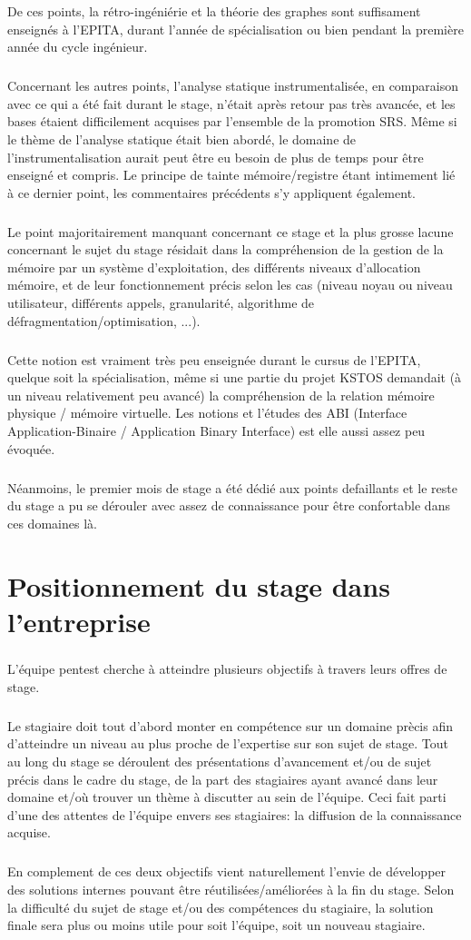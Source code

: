 De ces points, la rétro-ingéniérie et la théorie des graphes sont suffisament enseignés à l'EPITA,
durant l'année de spécialisation ou bien pendant la première année du cycle ingénieur.
\subparagraph{}
Concernant les autres points, l'analyse statique instrumentalisée, en comparaison avec ce qui a été
fait durant le stage, n'était après retour pas très avancée, et les bases étaient difficilement acquises par
l'ensemble de la promotion SRS. Même si le thème de l'analyse statique était bien abordé, le domaine de l'instrumentalisation
aurait peut être eu besoin de plus de temps pour être enseigné et compris. Le principe de tainte mémoire/registre étant intimement
lié à ce dernier point, les commentaires précédents s'y appliquent également.
\subparagraph{}
Le point majoritairement manquant concernant ce stage et la plus grosse lacune concernant le sujet du stage résidait dans la compréhension de
la gestion de la mémoire par un système d'exploitation, des différents niveaux d'allocation mémoire, et de leur fonctionnement précis
selon les cas (niveau noyau ou niveau utilisateur, différents appels, granularité, algorithme de défragmentation/optimisation, ...).
\subparagraph{}
Cette notion est vraiment très peu enseignée durant le cursus de l'EPITA, quelque soit la spécialisation, même si une partie du projet KSTOS
demandait (à un niveau relativement peu avancé) la compréhension de la relation mémoire physique / mémoire virtuelle.
Les notions et l'études des ABI (Interface Application-Binaire / Application Binary Interface) est elle aussi assez peu évoquée.
\subparagraph{}

Néanmoins, le premier mois de stage a été dédié aux points defaillants et le reste du stage a pu se dérouler avec assez de connaissance
pour être confortable dans ces domaines là.

\subparagraph{}


\section*{Positionnement du stage dans l'entreprise}
\paragraph{}
\subparagraph{}
L'équipe pentest cherche à atteindre plusieurs objectifs à travers leurs offres de stage.
\subparagraph{}
Le stagiaire doit tout d'abord monter en compétence sur un domaine prècis afin d'atteindre un niveau au plus proche de l'expertise sur son sujet de stage.\newline
Tout au long du stage se déroulent des présentations d'avancement et/ou de sujet précis dans le cadre du stage, de la part des stagiaires ayant avancé dans leur domaine et/où trouver un thème à discutter au sein de l'équipe. Ceci fait parti d'une des attentes de l'équipe envers ses stagiaires: la diffusion de la connaissance acquise.
\subparagraph{}
En complement de ces deux objectifs vient naturellement l'envie de développer des solutions internes pouvant être réutilisées/améliorées à la fin du stage. Selon la difficulté du sujet de stage et/ou des compétences du stagiaire, la solution finale sera plus ou moins utile pour soit l'équipe, soit un nouveau stagiaire.\newline

